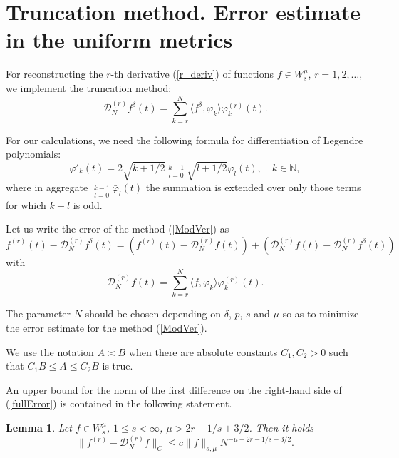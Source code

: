 \documentclass[10pt]{extarticle}
\newtheorem{lemma}[theorem]{Lemma}
\begin{document}
\section{Truncation method. Error estimate in the uniform metrics}
For reconstructing the $r$-th derivative (\ref{r_deriv}) of functions $f\in W_s^\mu$, $r=1,2,\ldots$,
we implement the truncation method:
\begin{equation}\label{ModVer}
	\mathcal{D}_N^{(r)} f^\delta(t) = \sum_{k=r}^{N} \langle f^\delta, \varphi_k\rangle \varphi_k^{(r)}(t).
\end{equation}

For our calculations, we need the following formula for differentiation of Legendre polynomials:
\begin{equation} \label{dif_ort}
\varphi'_k(t) = 2\sqrt{k + 1/2}\mathop{{\sum}^*}\limits_{l=0}^{k-1} \sqrt{l + 1/2}\varphi_l(t), \quad k \in \mathbb{N} ,
\end{equation}
where in aggregate \quad $ \mathop{{\sum}^*}\limits_{l=0}^{k-1} \bar{\varphi}_{l}(t)$ the summation
is extended over only those terms for which $k+l$ is odd.

Let us write the error of the method (\ref{ModVer}) as
\begin{equation}\label{fullError}
	f^{(r)}(t)-\mathcal{D}_N^{(r)} f^\delta(t)= \left(f^{(r)}(t)-\mathcal{D}_N^{(r)}
	f(t)\right)+\left(\mathcal{D}_N^{(r)} f(t)-\mathcal{D}_N^{(r)} f^\delta(t)\right)
\end{equation}
with
$$
\mathcal{D}_N^{(r)} f(t) = \sum_{k=r}^{N} \langle f, \varphi_{k}\rangle \varphi^{(r)}_k(t) .
$$

The parameter $N$ should be chosen depending on $\delta$, $p$, $s$ and $\mu$ so as
to minimize the error estimate for the method (\ref{ModVer}).

We use the notation $A\asymp B$ when there are absolute constants $C_1, C_2>0$ such that $C_1 B \le A \le C_2 B$ is true.

An upper bound for the norm of the first difference on the right-hand side of (\ref{fullError}) is contained in the following statement.

\begin{lemma}\label{lemma_BoundErrHCC}
	Let $f\in W^\mu_{s}$, $1\leq s< \infty$, $\mu>2r-1/s+3/2$. Then it holds
	$$
	\|f^{(r)}-\mathcal{D}^{(r)}_N f\|_{C}\leq c\|f\|_{s,\mu} N^{-\mu+2r-1/s+3/2} .
	$$
\end{lemma}
\end{document}
